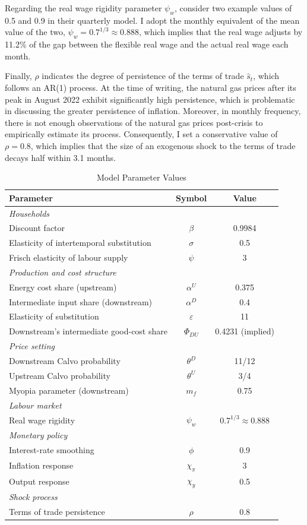 \documentclass[a4paper, 12pt]{article}
\theoremstyle{definition*}
\begin{document}
Regarding the real wage rigidity parameter $\psi_w$, \cite{blanchard2007real} consider two example values of 0.5 and 0.9 in their quarterly model.
I adopt the monthly equivalent of the mean value of the two, $\psi_w = 0.7^{1/3} \approx 0.888$, which implies that the real wage adjusts by 11.2\% of the gap between the flexible real wage and the actual real wage each month.

Finally, $\rho$ indicates the degree of persistence of the terms of trade $\hat s_t$, which follows an AR(1) process.
At the time of writing, the natural gas prices after its peak in August 2022 exhibit significantly high persistence, which is problematic in discussing the greater persistence of inflation.
Moreover, in monthly frequency, there is not enough observations of the natural gas prices post-crisis to empirically estimate its process.
Consequently, I set a conservative value of $\rho = 0.8$, which implies that the size of an exogenous shock to the terms of trade decays half within 3.1 months.

\begin{table}[t]
\centering
\caption{Model Parameter Values}
\label{tab:parameters}
\begin{tabular}{lcc}
\toprule
Parameter & Symbol & Value \\
\midrule
\textit{Households} \\
Discount factor & $\beta$ & 0.9984 \\
Elasticity of intertemporal substitution & $\sigma$ & 0.5 \\
Frisch elasticity of labour supply & $\psi$ & 3 \\
\midrule
\textit{Production and cost structure} \\
Energy cost share (upstream) & $\alpha^U$ & 0.375 \\
Intermediate input share (downstream) & $\alpha^D$ & 0.4 \\
Elasticity of substitution & $\varepsilon$ & 11 \\
Downstream's intermediate good-cost share & $\Phi_{DU}$ & 0.4231 (implied) \\
\midrule
\textit{Price setting} \\
Downstream Calvo probability & $\theta^D$ & 11/12 \\
Upstream Calvo probability & $\theta^U$ & 3/4 \\
Myopia parameter (downstream) & $m_f$ & 0.75 \\
\midrule
\textit{Labour market} \\
Real wage rigidity & $\psi_w$ & $0.7^{1/3} \approx 0.888$ \\
\midrule
\textit{Monetary policy} \\
Interest-rate smoothing & $\phi$ & 0.9 \\
Inflation response & $\chi_\pi$ & 3 \\
Output response & $\chi_y$ & 0.5 \\
\midrule
\textit{Shock process} \\
Terms of trade persistence & $\rho$ & 0.8 \\
\bottomrule
\end{tabular}
\end{table}
\end{document}
